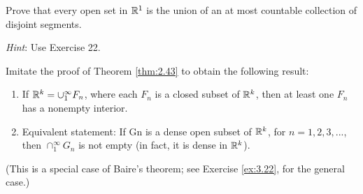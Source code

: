 \begin{myExercise}
    \label{ex:2.29}
    Prove that every open set in ${\protect\mathbb R}^1$ is the union of an at most countable collection of disjoint segments. 

    \emph{Hint}: Use Exercise 22.
\end{myExercise}

\begin{myExercise}
    \label{ex:2.30}
    Imitate the proof of Theorem \ref{thm:2.43} to obtain the following result:
    \begin{enumerate}
        \item If ${\protect\mathbb R}^k = \cup_1^{\infty} F_n$, where each $F_n$ is a closed subset of ${\protect\mathbb R}^k$, then at least one $F_n$ has a nonempty interior. 
        \item Equivalent statement: If Gn is a dense open subset of ${\protect\mathbb R}^k$, for $n = 1, 2, 3, ... $, then $\cap_1^{\infty} G_n$ is not empty (in fact, it is dense in ${\protect\mathbb R}^k$).
    \end{enumerate}
    (This is a special case of Baire's theorem; see Exercise \ref{ex:3.22}, for the general case.)
\end{myExercise}